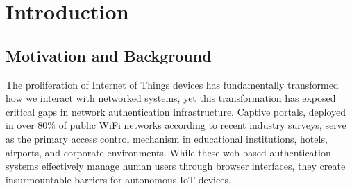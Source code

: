 \documentclass[conference]{IEEEtran}
\begin{document}
\section{Introduction}

\subsection{Motivation and Background}

The proliferation of Internet of Things devices has fundamentally transformed how we interact with networked systems, yet this transformation has exposed critical gaps in network authentication infrastructure. Captive portals, deployed in over 80\% of public WiFi networks according to recent industry surveys, serve as the primary access control mechanism in educational institutions, hotels, airports, and corporate environments. While these web-based authentication systems effectively manage human users through browser interfaces, they create insurmountable barriers for autonomous IoT devices.
\end{document}

